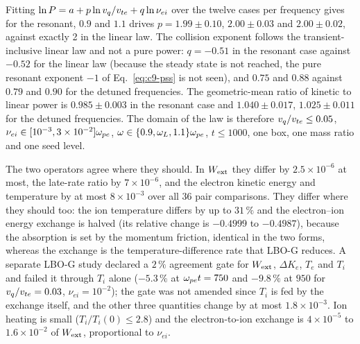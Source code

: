 Fitting $\ln P=a+p\ln v_q/v_{te}+q\ln\nu_{ei}$ over the twelve cases per frequency gives for the resonant, $0.9$ and $1.1$ drives $p=1.99\pm0.10$, $2.00\pm0.03$ and $2.00\pm0.02$, against exactly 2 in the linear law. The collision exponent follows the transient-inclusive linear law and not a pure power: $q=-0.51$ in the resonant case against $-0.52$ for the linear law (because the steady state is not reached, the pure resonant exponent $-1$ of Eq.~\eqref{eq:c9-pss} is not seen), and $0.75$ and $0.88$ against $0.79$ and $0.90$ for the detuned frequencies. The geometric-mean ratio of kinetic to linear power is $0.985\pm0.003$ in the resonant case and $1.040\pm0.017$, $1.025\pm0.011$ for the detuned frequencies. The domain of the law is therefore $v_q/v_{te}\le0.05$, $\nu_{ei}\in[10^{-3},3\times10^{-2}]\omega_{pe}$, $\omega\in\{0.9,\omega_L,1.1\}\omega_{pe}$, $t\le1000$, one box, one mass ratio and one seed level.


The two operators agree where they should. In $W_{\rm ext}$ they differ by $2.5\times10^{-6}$ at most, the late-rate ratio by $7\times10^{-6}$, and the electron kinetic energy and temperature by at most $8\times10^{-3}$ over all 36 pair comparisons. They differ where they should too: the ion temperature differs by up to $31\,\%$ and the electron--ion energy exchange is halved (its relative change is $-0.4999$ to $-0.4987$), because the absorption is set by the momentum friction, identical in the two forms, whereas the exchange is the temperature-difference rate that LBO-G reduces. A separate LBO-G study declared a $2\,\%$ agreement gate for $W_{\rm ext}$, $\Delta K_e$, $T_e$ and $T_i$ and failed it through $T_i$ alone ($-5.3\,\%$ at $\omega_{pe} t=750$ and $-9.8\,\%$ at $950$ for $v_q/v_{te}=0.03$, $\nu_{ei}=10^{-2}$); the gate was not amended since $T_i$ is fed by the exchange itself, and the other three quantities change by at most $1.8\times10^{-3}$. Ion heating is small ($T_i/T_i(0)\le2.8$) and the electron-to-ion exchange is $4\times10^{-5}$ to $1.6\times10^{-2}$ of $W_{\rm ext}$, proportional to $\nu_{ei}$.

